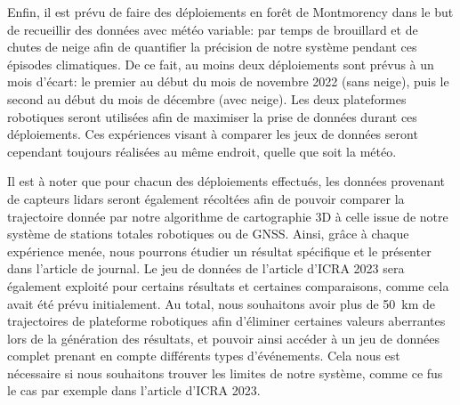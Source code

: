 Enfin, il est prévu de faire des déploiements en forêt de Montmorency dans le but de recueillir des données avec météo variable: par temps de brouillard et de chutes de neige afin de quantifier la précision de notre système pendant ces épisodes climatiques.
De ce fait, au moins deux déploiements sont prévus à un mois d'écart: le premier au début du mois de novembre 2022 (sans neige), puis le second au début du mois de décembre (avec neige).
Les deux plateformes robotiques seront utilisées afin de maximiser la prise de données durant ces déploiements.
Ces expériences visant à comparer les jeux de données seront cependant toujours réalisées au même endroit, quelle que soit la météo.

Il est à noter que pour chacun des déploiements effectués, les données provenant de capteurs lidars seront également récoltées afin de pouvoir comparer la trajectoire donnée par notre algorithme de cartographie 3D à celle issue de notre système de stations totales robotiques ou de \ac{GNSS}.
Ainsi, grâce à chaque expérience menée, nous pourrons étudier un résultat spécifique et le présenter dans l'article de journal.
Le jeu de données de l'article d'ICRA 2023 sera également exploité pour certains résultats et certaines comparaisons, comme cela avait été prévu initialement.
Au total, nous souhaitons avoir plus de \SI{50}{km} de trajectoires de plateforme robotiques afin d'éliminer certaines valeurs aberrantes lors de la génération des résultats, et pouvoir ainsi accéder à un jeu de données complet prenant en compte différents types d'événements.
Cela nous est nécessaire si nous souhaitons trouver les limites de notre système, comme ce fus le cas par exemple dans l'article d'ICRA 2023.